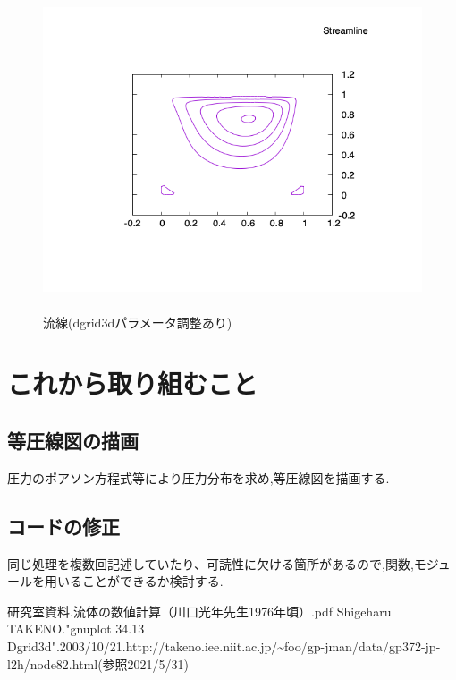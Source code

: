 \documentclass[upLaTeX,a4paper]{jsarticle}
\begin{document}
\begin{figure}[H]
  \centering
  \includegraphics[height=9.5cm]{outputs/img/stream_line.png}
  \caption{流線(dgrid3dパラメータ調整あり)}
  \label{fig:stream_line}
\end{figure}
\section{これから取り組むこと}
\subsection{等圧線図の描画}
圧力のポアソン方程式等により圧力分布を求め,等圧線図を描画する.

\subsection{コードの修正}
同じ処理を複数回記述していたり、可読性に欠ける箇所があるので,関数,モジュールを用いることができるか検討する.

\begin{thebibliography}{9}
   研究室資料.流体の数値計算（川口光年先生1976年頃）.pdf
   Shigeharu TAKENO."gnuplot 34.13 Dgrid3d".2003/10/21.http://takeno.iee.niit.ac.jp/\textasciitilde foo/gp-jman/data/gp372-jp-l2h/node82.html(参照2021/5/31)

\end{thebibliography}
\end{document}
